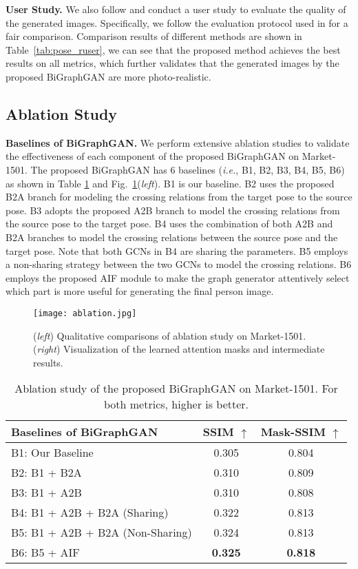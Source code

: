 \documentclass{bmvc2k}
\begin{document}
\noindent \textbf{User Study.}
We also follow \cite{ma2017pose,siarohin2018deformable,zhu2019progressive} and conduct a user study to evaluate the quality of the generated images.
Specifically, we follow the evaluation protocol used in \cite{zhu2019progressive} for a fair comparison.
Comparison results of different methods are shown in Table~\ref{tab:pose_ruser}, we can see that the proposed method achieves the best results on all metrics, which further validates that the generated images by the proposed BiGraphGAN are more photo-realistic.

\subsection{Ablation Study}
\noindent \textbf{Baselines of BiGraphGAN.}
We perform extensive ablation studies to validate the effectiveness of each component of the proposed BiGraphGAN on Market-1501. 
The proposed BiGraphGAN has 6 baselines (\emph{i.e.}, B1, B2, B3, B4, B5, B6) as shown in Table \ref{tab:ablation} and Fig.~\ref{fig:ablation}(\textit{left}).
B1 is our baseline.  
B2 uses the proposed B2A branch for modeling the crossing relations from the target pose to the source pose.
B3 adopts the proposed A2B branch to model the crossing relations from the source pose to the target pose.
B4 uses the combination of both A2B and B2A branches to model the crossing relations between the source pose and the target pose.
Note that both GCNs in B4 are sharing the parameters.
B5 employs a non-sharing strategy between the two GCNs to model the crossing relations.
B6 employs the proposed AIF module to make the graph generator attentively select which part is more useful for generating the final person image.

\begin{figure}[!t]
	\centering
	\texttt{[image: ablation.jpg]}
	\caption{(\textit{left}) Qualitative comparisons of ablation study on Market-1501. (\textit{right}) Visualization of the learned attention masks and intermediate results.}
	\label{fig:ablation}
\end{figure}

\begin{table}[!t]
	\centering
	\caption{Ablation study of the proposed BiGraphGAN on Market-1501. For both metrics, higher is better.}
	\begin{tabular}{lcc} \toprule
		Baselines of BiGraphGAN & SSIM $\uparrow$ & Mask-SSIM $\uparrow$    \\ \midrule
		B1: Our Baseline & 0.305 & 0.804 \\ 
		B2: B1 + B2A     & 0.310 & 0.809 \\
		B3: B1 + A2B     & 0.310 & 0.808 \\
		B4: B1 + A2B + B2A (Sharing) & 0.322 & 0.813 \\
		B5: B1 + A2B + B2A (Non-Sharing) & 0.324 & 0.813 \\
		B6: B5 + AIF & \textbf{0.325} & \textbf{0.818} \\
		\bottomrule	
	\end{tabular}
	\label{tab:ablation}
\end{table}
\end{document}
